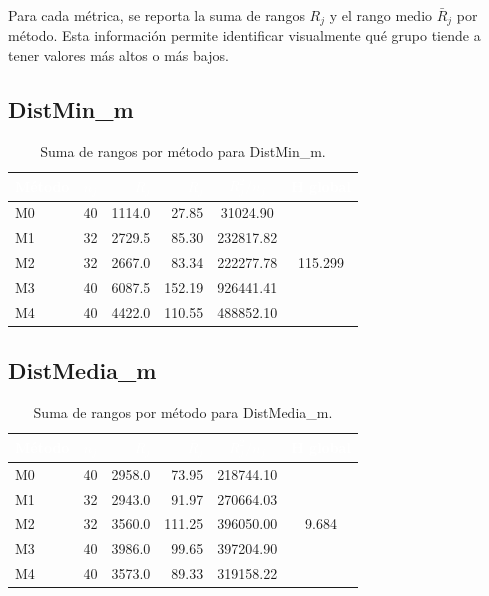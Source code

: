 \documentclass[12pt,a4paper,oneside]{book}
\begin{document}
Para cada métrica, se reporta la suma de rangos $R_j$ y el rango medio $\bar{R}_j$ por método. Esta información permite identificar visualmente qué grupo tiende a tener valores más altos o más bajos.

\subsection{DistMin\_m}

\begin{table}[H]
\centering
\small
\caption{Suma de rangos por método para DistMin\_m.}
\begin{tabular}{lcrrcc}
\toprule
\rowcolor{primary}
\textcolor{white}{\textbf{Método}} & \textcolor{white}{$n_j$} & \textcolor{white}{$R_j$} & \textcolor{white}{$\bar{R}_j$} & \textcolor{white}{$R_j^2/n_j$} & \textcolor{white}{H global} \\
\midrule
M0 & 40 & 1114.0 & 27.85 & 31024.90 & \multirow{5}{*}{115.299} \\
M1 & 32 & 2729.5 & 85.30 & 232817.82 & \\
M2 & 32 & 2667.0 & 83.34 & 222277.78 & \\
M3 & 40 & 6087.5 & 152.19 & 926441.41 & \\
M4 & 40 & 4422.0 & 110.55 & 488852.10 & \\
\bottomrule
\end{tabular}
\end{table}

\subsection{DistMedia\_m}

\begin{table}[H]
\centering
\small
\caption{Suma de rangos por método para DistMedia\_m.}
\begin{tabular}{lcrrcc}
\toprule
\rowcolor{primary}
\textcolor{white}{\textbf{Método}} & \textcolor{white}{$n_j$} & \textcolor{white}{$R_j$} & \textcolor{white}{$\bar{R}_j$} & \textcolor{white}{$R_j^2/n_j$} & \textcolor{white}{H global} \\
\midrule
M0 & 40 & 2958.0 & 73.95 & 218744.10 & \multirow{5}{*}{9.684} \\
M1 & 32 & 2943.0 & 91.97 & 270664.03 & \\
M2 & 32 & 3560.0 & 111.25 & 396050.00 & \\
M3 & 40 & 3986.0 & 99.65 & 397204.90 & \\
M4 & 40 & 3573.0 & 89.33 & 319158.22 & \\
\bottomrule
\end{tabular}
\end{table}
\end{document}
